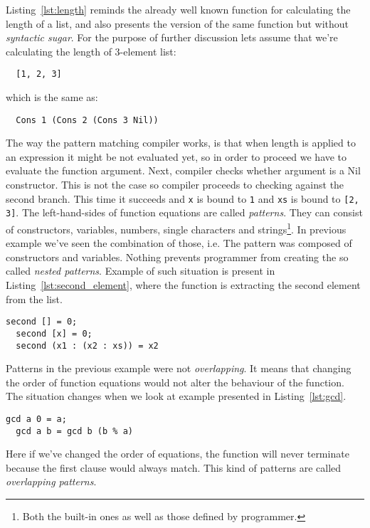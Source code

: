 \documentclass[a4paper]{report}
\begin{document}
Listing~\ref{lst:length} reminds the already well known function for
calculating the length of a list, and also presents the version of the same
function but without \textit{syntactic sugar}. For the purpose of further
discussion lets assume that we're calculating the length of 3-element list:

\begin{verbatim}
  [1, 2, 3]
\end{verbatim}
which is the same as:
\begin{verbatim}
  Cons 1 (Cons 2 (Cons 3 Nil))
\end{verbatim}

The way the pattern matching compiler works, is that when length is applied to
an expression it might be not evaluated yet, so in order to proceed we have to
evaluate the function argument. Next, compiler checks whether argument is a Nil
constructor. This is not the case so compiler proceeds to checking against the
second branch. This time it succeeds and \texttt{x} is bound to \texttt{1} and
\texttt{xs} is bound to \texttt{[2, 3]}. The left-hand-sides of function
equations are called \textit{patterns}. They can consist of constructors,
variables, numbers, single characters and strings\footnote{Both the built-in
ones as well as those defined by programmer.}. In previous example we've seen
the combination of those, i.e. The pattern was composed of constructors and
variables. Nothing prevents programmer from creating the so called
\textit{nested patterns}. Example of such situation is present in
Listing~\ref{lst:second_element}, where the function is extracting the second
element from the list.

\begin{lstlisting}[label=lst:second_element,caption={Greatest common divisor.}]
  second [] = 0;
  second [x] = 0;
  second (x1 : (x2 : xs)) = x2
\end{lstlisting}

Patterns in the previous example were not \textit{overlapping}. It
means that changing the order of function equations would not alter the
behaviour of the function. The situation changes when we look at example
presented in Listing~\ref{lst:gcd}.

\begin{lstlisting}[label=lst:gcd,caption={Greatest common divisor.}]
  gcd a 0 = a;
  gcd a b = gcd b (b % a)
\end{lstlisting}

Here if we've changed the order of equations, the function will never terminate
because the first clause would always match. This kind of patterns are called
\textit{overlapping patterns}.
\end{document}
